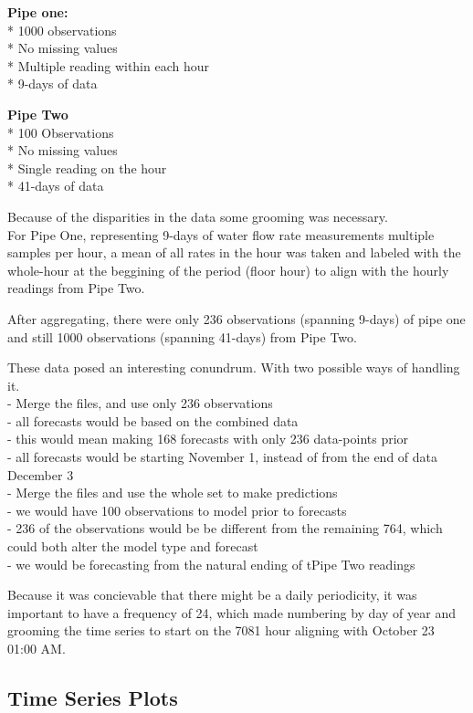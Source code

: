 \documentclass[openany]{book}
\begin{document}
\textbf{Pipe one:}\\
* 1000 observations\\
* No missing values\\
* Multiple reading within each hour\\
* 9-days of data

\textbf{Pipe Two}\\
* 100 Observations\\
* No missing values\\
* Single reading on the hour\\
* 41-days of data

Because of the disparities in the data some grooming was necessary.\\
For Pipe One, representing 9-days of water flow rate measurements
multiple samples per hour, a mean of all rates in the hour was taken and
labeled with the whole-hour at the beggining of the period (floor hour)
to align with the hourly readings from Pipe Two.

After aggregating, there were only 236 observations (spanning 9-days) of
pipe one and still 1000 observations (spanning 41-days) from Pipe Two.

These data posed an interesting conundrum. With two possible ways of
handling it.\\
- Merge the files, and use only 236 observations\\
- all forecasts would be based on the combined data\\
- this would mean making 168 forecasts with only 236 data-points prior\\
- all forecasts would be starting November 1, instead of from the end of
data December 3\\
- Merge the files and use the whole set to make predictions\\
- we would have 100 observations to model prior to forecasts\\
- 236 of the observations would be be different from the remaining 764,
which could both alter the model type and forecast\\
- we would be forecasting from the natural ending of tPipe Two readings

Because it was concievable that there might be a daily periodicity, it
was important to have a frequency of 24, which made numbering by day of
year and grooming the time series to start on the 7081 hour aligning
with October 23 01:00 AM.

\hypertarget{time-series-plots}{%
\subsection{Time Series Plots}\label{time-series-plots}}
\end{document}
